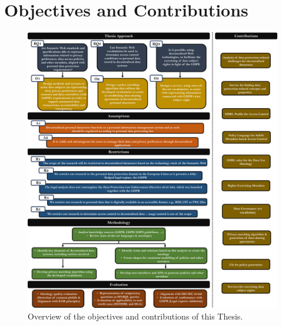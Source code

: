 \chapter{Objectives and Contributions}
\label{chap:objectives}

\begin{figure}[p]
    \centering
    \includegraphics[width=1.1\linewidth]{figures/chapter-3/rqs_objs_diagram.png}
    \caption{Overview of the objectives and contributions of this Thesis.}
    \label{fig:objectives}
\end{figure}







